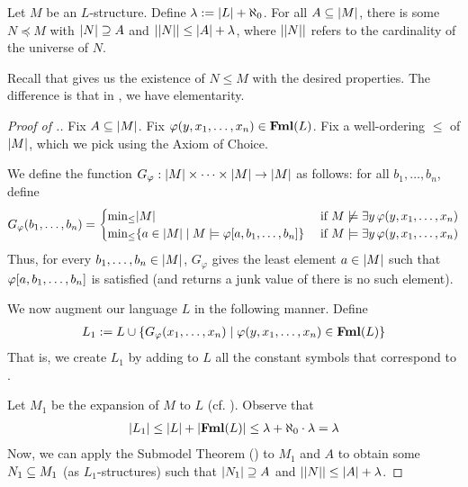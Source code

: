 \begin{boxtheorem}\label{Ch1:Thm:Downwards_LS}
    Let $M$ be an $L$-structure. Define $\lambda := \left\lvert L \right\rvert + \aleph_0$. For all $A \subseteq \left\lvert M \right\rvert$, there is some $N \preceq M$ with $\left\lvert N \right\rvert \supseteq A$ and $\left\lvert \left\lvert N \right\rvert \right\rvert \leq \left\lvert A \right\rvert + \lambda$, where $\left\lvert \left\lvert N \right\rvert \right\rvert$ refers to the cardinality of the universe of $N$.
\end{boxtheorem}
Recall that  gives us the existence of $N \leq M$ with the desired properties. The difference is that in , we have elementarity.
\begin{proof}[Proof of .]
    Fix $A \subseteq \left\lvert M \right\rvert$. Fix $\varphi\!\left( y, x_1, \ldots, x_n \right) \in \mathbf{Fml}(L)$. Fix a well-ordering $\leq$ of $\left\lvert M \right\rvert$, which we pick using the Axiom of Choice.
    
    We define the function $G_{\varphi} : \left\lvert M \right\rvert \times \cdots \times \left\lvert M \right\rvert \to \left\lvert M \right\rvert$ as follows: for all $b_1, \ldots, b_n$, define
    \begin{align}
        G_{\varphi}\!\left( b_1, \ldots, b_n \right)
        =
        \begin{cases}
            \min_{\leq}\!\left\lvert M \right\rvert & \text{ if } M \not\models \exists y \, \varphi\!\left( y, x_1, \ldots, x_n \right) \\
            \min_{\leq}\!\left\{ a \in \left\lvert M \right\rvert \; \middle\vert \; M \models \varphi\!\left[ a, b_1, \ldots, b_n \right] \right\} & \text{ if } M \models \exists y \, \varphi\!\left( y, x_1, \ldots, x_n \right)
        \end{cases}
        \label{Ch1:Eq:DLS_Skolem_Fn}
    \end{align}
    Thus, for every $b_1, \ldots, b_n \in \left\lvert M \right\rvert$, $G_{\varphi}$ gives the least element $a \in \left\lvert M \right\rvert$ such that $\varphi\!\left[ a, b_1, \ldots, b_n \right]$ is satisfied (and returns a junk value of there is no such element).

    We now augment our language $L$ in the following manner. Define
    \begin{align}
        L_1 := L \cup \left\{ G_{\varphi}\!\left( x_1, \ldots, x_n \right) \; \middle\vert \; \varphi\!\left( y, x_1, \ldots, x_n \right) \in \mathbf{Fml}(L) \right\}
        \label{Ch1:Eq:DLS_Lang_Augmentation}
    \end{align}
    That is, we create $L_1$ by adding to $L$ all the constant symbols that correspond to \sorry.

    Let $M_1$ be the expansion of $M$ to $L$ (cf. ). Observe that
    \begin{align*}
        \left\lvert L_1 \right\rvert \leq \left\lvert L \right\rvert + \left\lvert \mathbf{Fml}(L) \right\rvert \leq \lambda + \aleph_0 \cdot \lambda = \lambda
    \end{align*}
    Now, we can apply the Submodel Theorem () to $M_1$ and $A$ to obtain some $N_1 \subseteq M_1$ (as $L_1$-structures) such that $\left\lvert N_1 \right\rvert \supseteq A$ and $\left\lvert \left\lvert N \right\rvert \right\rvert \leq \left\lvert A \right\rvert + \lambda$.


\end{proof}

